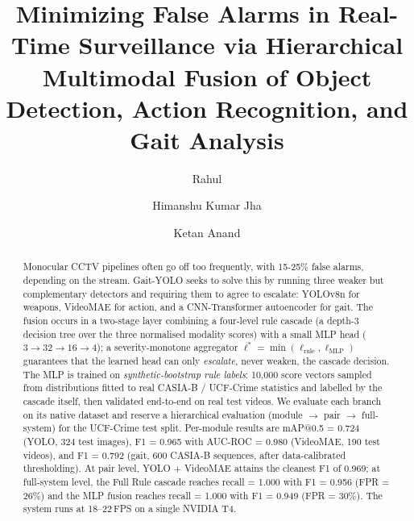 \documentclass[runningheads]{llncs}
\begin{document}
\title{Minimizing False Alarms in Real-Time Surveillance via Hierarchical Multimodal Fusion of Object Detection, Action Recognition, and Gait Analysis}


\author{
Rahul \and
Himanshu Kumar Jha \and
Ketan Anand 
}



\maketitle

\begin{abstract}
Monocular CCTV pipelines often go off too frequently, with 15-25\% false alarms, depending on the stream. Gait-YOLO seeks to solve this by running three weaker but complementary detectors and requiring them to agree to escalate: YOLOv8n for weapons, VideoMAE for action, and a CNN-Transformer autoencoder for gait. The fusion occurs in a two-stage layer combining a four-level rule cascade (a depth-3 decision tree over the three normalised modality scores) with a small MLP head ($3{\to}32{\to}16{\to}4$); a severity-monotone aggregator $\ell^*=\min(\ell_\text{rule},\ell_\text{MLP})$ guarantees that the learned head can only \emph{escalate}, never weaken, the cascade decision. The MLP is trained on \emph{synthetic-bootstrap rule labels}: 10{,}000 score vectors sampled from distributions fitted to real CASIA-B / UCF-Crime statistics and labelled by the cascade itself, then validated end-to-end on real test videos.
We evaluate each branch on its native dataset and reserve a hierarchical evaluation (module $\to$ pair $\to$ full-system) for the UCF-Crime test split. Per-module results are mAP@0.5 = 0.724 (YOLO, 324 test images), F1 = 0.965 with AUC-ROC = 0.980 (VideoMAE, 190 test videos), and F1 = 0.792 (gait, 600 CASIA-B sequences, after data-calibrated thresholding). At pair level, YOLO + VideoMAE attains the cleanest F1 of 0.969; at full-system level, the Full Rule cascade reaches recall = 1.000 with F1 = 0.956 (FPR = 26\%) and the MLP fusion reaches recall = 1.000 with F1 = 0.949 (FPR = 30\%). The system runs at 18--22\,FPS on a single NVIDIA T4.

\end{abstract}
\end{document}
